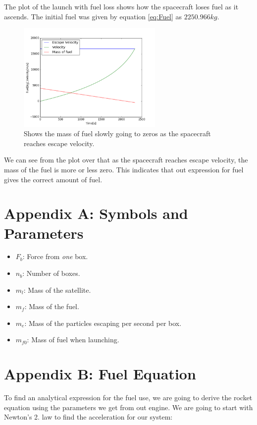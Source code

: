 \documentclass[a4paper, 10pt]{article}
\begin{document}
The plot of the launch with fuel loss shows how the spacecraft loses fuel as it ascends. The initial fuel was given by equation \ref{eq:Fuel} as $2250.966 kg$.


\begin{figure}[H]
\begin{center}
\includegraphics[width = 70mm]{part1launchVarMass.png}
\caption{Shows the mass of fuel slowly going to zeros as the spacecraft reaches escape velocity.}
\end{center}
\end{figure}

We can see from the plot over that as the spacecraft reaches escape velocity, the mass of the fuel is more or less zero. This indicates that out expression for fuel gives the correct amount of fuel.

\section{Appendix A: Symbols and Parameters} 
\begin{itemize}
\item $F_b$: Force from \textit{one} box.
\item $n_b$: Number of boxes.
\item $m_l$: Mass of the satellite.
\item $m_f$: Mass of the fuel.
\item $m_e$: Mass of the particles escaping per second per box.
\item $m_{f0}$: Mass of fuel when launching.
\end{itemize}

\section{Appendix B: Fuel Equation}\label{sec:Fuel}

To find an analytical expression for the fuel use, we are going to derive the rocket equation using the parameters we get from out engine. We are going to start with Newton's 2. law to find the acceleration for our system:
\end{document}
